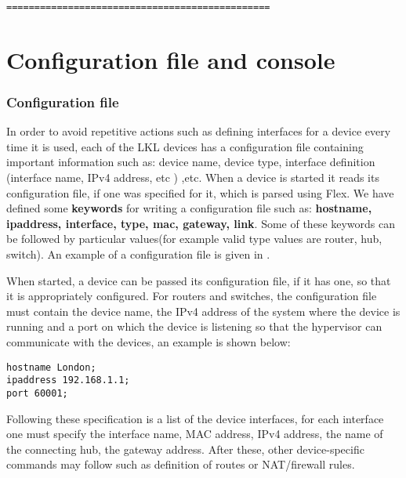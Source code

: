 {{\begin{lstlisting}
===============================================
\end{lstlisting}
 

\section{Configuration file and console}
\label{sec:config}

\subsubsection{Configuration file}
\label{subsec:config-file}
In order to avoid repetitive actions such as defining interfaces for a device every time it is used, each of the LKL devices has a configuration file containing important information such as: device name, device type, interface definition (interface name, IPv4 address, etc ) ,etc. When a device is started it reads its configuration file, if one was specified for it, which is parsed using Flex. We have defined some \textbf{keywords} for writing a configuration file such as: \textbf{hostname, ipaddress, interface, type, mac, gateway, link}. Some of these keywords can be followed by particular values(for example valid type values are router, hub, switch). An example of a configuration file is given in .

When started, a device can be passed its configuration file, if it has one, so that it is appropriately configured.
For routers and switches, the configuration file must contain the device name, the IPv4 address of the system where the device is running and a port on which the device is listening so that the hypervisor can communicate with the devices, an example is shown below:
\lstset{language=TeX,caption=Fields of Configuration File,label=lst:config-file}
\begin{lstlisting}
hostname London;
ipaddress 192.168.1.1;
port 60001;
\end{lstlisting}
Following these specification is a list of the device interfaces, for each interface one must specify the interface name, MAC address, IPv4 address, the name of the connecting hub, the gateway address. After these, other device-specific commands may follow such as definition of routes or NAT/firewall rules.

}}
